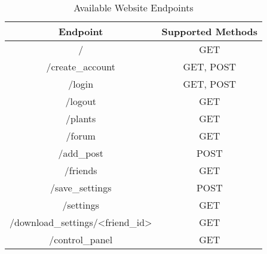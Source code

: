 \documentclass[12pt]{article} %
\begin{document}
\begin{table}[H]
    \centering
    \renewcommand{\arraystretch}{1.25} %
    \begin{tabular}{|c|c|}
        \hline
        \textbf{Endpoint} & \textbf{Supported Methods}\\
        \hline
        / & GET \\
        \hline
        /create\_account & GET, POST \\
        \hline
        /login & GET, POST \\
        \hline
        /logout & GET \\
        \hline
        /plants & GET \\
        \hline
        /forum & GET \\
        \hline
        /add\_post & POST \\
        \hline
        /friends & GET \\
        \hline
        /save\_settings & POST \\
        \hline
        /settings & GET \\
        \hline
        /download\_settings/<friend\_id> & GET \\
        \hline
        /control\_panel & GET \\
        \hline
    \end{tabular}
    \caption{Available Website Endpoints}
    \label{tab:Main_Endpoints}
\end{table}
\end{document}
